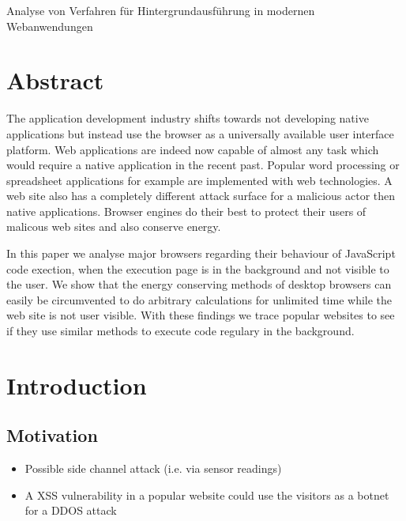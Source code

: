 \documentclass[article,type=bsc,colorback,accentcolor=tud9c]{tudthesis}
\begin{document}
    {Analyse von Verfahren für Hintergrundausführung in modernen Webanwendungen}
  \author{Yannick Reifschneider}
  \dateofexam{\today}{\today}
  \makethesistitle

  \tableofcontents

  \newpage
  \section{Abstract}

  The application development industry shifts towards not developing native applications but instead use the browser as a universally available user interface platform. Web applications are indeed now capable of almost any task which would require a native application in the recent past. Popular word processing or spreadsheet applications for example are implemented with web technologies. A web site also has a completely different attack surface for a malicious actor then native applications. Browser engines do their best to protect their users of malicous web sites and also conserve energy.
  
  In this paper we analyse major browsers regarding their behaviour of JavaScript code exection, when the execution page is in the background and not visible to the user. We show that the energy conserving methods of desktop browsers can easily be circumvented to do arbitrary calculations for unlimited time while the web site is not user visible. With these findings we trace popular websites to see if they use similar methods to execute code regulary in the background.

  \newpage
  \section{Introduction}
  
  \subsection{Motivation}

  \begin{itemize}
  \item Possible side channel attack (i.e. via sensor readings)
  \item A XSS vulnerability in a popular website could use the visitors as a botnet for a DDOS attack
  \end{itemize}
\end{document}
